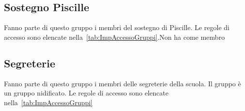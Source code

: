 \subsection{Sostegno Piscille}
Fanno parte di questo gruppo i membri del sostegno di Piscille.  Le  regole di accesso  sono elencate nella~\cref{tab:ImpAccessoGruppi}.Non ha come membro 
\subsection{Segreterie}
Fanno parte di questo gruppo i membri delle segreterie della scuola. Il gruppo è un gruppo nidificato. Le  regole di accesso  sono elencate nella~\cref{tab:ImpAccessoGruppi}
